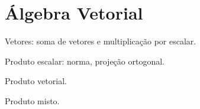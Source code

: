 \chapter{Álgebra Vetorial}

Vetores: soma de vetores e multiplicação por escalar.

Produto escalar: norma, projeção ortogonal.

Produto vetorial.

Produto misto.

